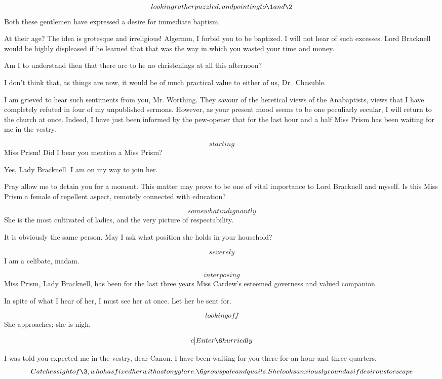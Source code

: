 \documentclass{book}
\begin{document}
\7  \[looking rather puzzled, and pointing to \1 and
\2\]  Both these gentlemen have expressed a desire for
immediate baptism.

\3  At their age?  The idea is grotesque and
irreligious!  Algernon, I forbid you to be baptized.  I will not
hear of such excesses.  Lord Bracknell would be highly displeased
if he learned that that was the way in which you wasted your time
and money.

\7  Am I to understand then that there are to he no
christenings at all this afternoon?

\1  I don't think that, as things are now, it would be of much
practical value to either of us, Dr.~Chasuble.

\7  I am grieved to hear such sentiments from you, Mr.
Worthing.  They savour of the heretical views of the Anabaptists,
views that I have completely refuted in four of my unpublished
sermons.  However, as your present mood seems to be one peculiarly
secular, I will return to the church at once.  Indeed, I have just
been informed by the pew-opener that for the last hour and a half
Miss Prism has been waiting for me in the vestry.

\3  \[starting\]  Miss Prism!  Did I bear you mention a
Miss Prism?

\7  Yes, Lady Bracknell.  I am on my way to join her.

\3  Pray allow me to detain you for a moment.  This
matter may prove to be one of vital importance to Lord Bracknell
and myself.  Is this Miss Prism a female of repellent aspect,
remotely connected with education?

\7  \[somewhat indignantly\]  She is the most cultivated of
ladies, and the very picture of respectability.

\3  It is obviously the same person.  May I ask what
position she holds in your household?

\7  \[severely\]  I am a celibate, madam.

\1  \[interposing\]  Miss Prism, Lady Bracknell, has been for the
last three years Miss Cardew's esteemed governess and valued
companion.

\3  In spite of what I hear of her, I must see her at
once.  Let her be sent for.

\7  \[looking off\]  She approaches; she is nigh.

\[c]Enter \6 hurriedly\]

\6  I was told you expected me in the vestry, dear Canon.
I have been waiting for you there for an hour and three-quarters.
\[Catches sight of \3, who has fixed her with a stony
glare.  \6 grows pale and quails.  She looks anxiously
round as if desirous to escape\]
\end{document}
